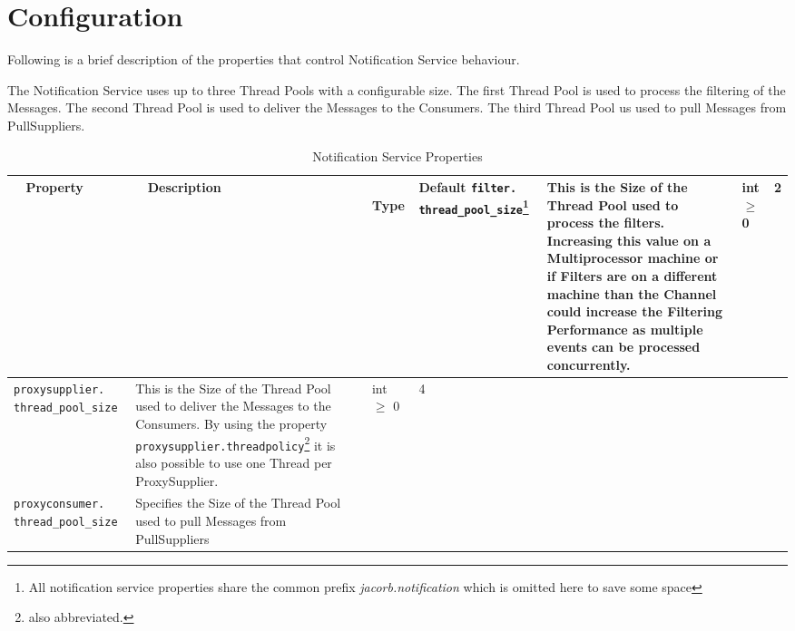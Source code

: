 \section{Configuration}
\label{sec:ntfy-configuration}

Following is a brief description of the properties
that control Notification Service behaviour.

The Notification Service uses up to three Thread Pools with a configurable
size. The first Thread Pool is used to process the filtering of the
Messages. The second Thread Pool is used to deliver the Messages to the
Consumers. The third Thread Pool us used to pull Messages from PullSuppliers. 

\begin{small}
  \begin{longtable}{|p{5cm}|p{7.5cm}|p{1.5cm}|p{1.5cm}|}
    \caption{Notification Service Properties}\\
    \hline
    ~ \hfill \textbf {Property} \hfill ~ & ~ \hfill \textbf {Description}
    \hfill ~ & ~ \hfill \textbf {Type} \hfill ~ & \hfill \textbf{Default} \endhead
    \hline
    \verb"filter."
    \verb"thread_pool_size"\footnote{All notification service
    properties share the common prefix \emph{jacorb.notification} which
    is omitted here to save some space} &

    This is the Size of the Thread Pool used to process the filters.
    Increasing this value on a Multiprocessor machine or if Filters are on
    a different machine than the Channel could increase the Filtering
    Performance as multiple events can be processed concurrently. & 
    
    int $\geq$ 0 &

    2 \\
    \hline

    \verb"proxysupplier."
    \verb"thread_pool_size" &

    This is the Size of the Thread Pool used to deliver the Messages to
    the Consumers. By using the property
    \texttt{proxysupplier.threadpolicy}\footnote{also abbreviated.}
    it is also possible to use one Thread per ProxySupplier. &

    int $\geq$ 0 & 
    4 \\ \hline    

    \verb"proxyconsumer."
    \verb"thread_pool_size" &

    Specifies the Size of the Thread Pool used to pull Messages from
    PullSuppliers &


\end{longtable}
\end{small}
